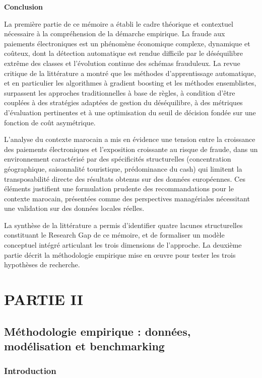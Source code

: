 \textbf{Conclusion }

La première partie de ce mémoire a établi le cadre théorique et contextuel nécessaire à la compréhension de la démarche empirique. La fraude aux paiements électroniques est un phénomène économique complexe, dynamique et coûteux, dont la détection automatique est rendue difficile par le déséquilibre extrême des classes et l'évolution continue des schémas frauduleux. La revue critique de la littérature a montré que les méthodes d'apprentissage automatique, et en particulier les algorithmes à gradient boosting et les méthodes ensemblistes, surpassent les approches traditionnelles à base de règles, à condition d'être couplées à des stratégies adaptées de gestion du déséquilibre, à des métriques d'évaluation pertinentes et à une optimisation du seuil de décision fondée sur une fonction de coût asymétrique.

L'analyse du contexte marocain a mis en évidence une tension entre la croissance des paiements électroniques et l'exposition croissante au risque de fraude, dans un environnement caractérisé par des spécificités structurelles (concentration géographique, saisonnalité touristique, prédominance du cash) qui limitent la transposabilité directe des résultats obtenus sur des données européennes. Ces éléments justifient une formulation prudente des recommandations pour le contexte marocain, présentées comme des perspectives managériales nécessitant une validation sur des données locales réelles.

La synthèse de la littérature a permis d'identifier quatre lacunes structurelles constituant le Research Gap de ce mémoire, et de formaliser un modèle conceptuel intégré articulant les trois dimensions de l'approche. La deuxième partie décrit la méthodologie empirique mise en œuvre pour tester les trois hypothèses de recherche.

\part{PARTIE II}

\chapter*{Méthodologie empirique : données, modélisation et benchmarking}

\section*{Introduction}

